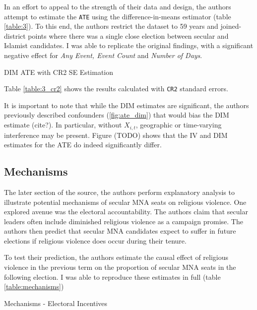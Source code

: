 \documentclass{scrartcl}
\begin{document}
In an effort to appeal to the strength of their data and design, the authors attempt to estimate the \texttt{ATE} using the difference-in-means estimator (table \ref{table:3}).
To this end, the authors restrict the dataset to 59 years and joined-district points where there was a single close election between secular and Islamist candidates. I was able to replicate the original findings, with a significant negative effect for \textit{Any Event, Event Count} and \textit{Number of Days}.


\begin{table}[ht!]
  \begin{center}
    \scalebox{0.75}{
      
    }
    \caption{DIM ATE with CR2 SE Estimation}
    \label{table:3_cr2}
  \end{center}
\end{table}

Table \ref{table:3_cr2} shows the results calculated with \texttt{CR2} standard errors. 

It is important to note that while the DIM estimates are significant, the authors previously described confounders (\ref{fig:ate_dim}) that would bias the DIM estimate (cite?).
In particular, without $X_{i,t}$, geographic or time-varying interference may be present.
Figure (TODO) shows that the IV and DIM estimates for the ATE do indeed significantly differ. 


\subsection{Mechanisms}

The later section of the source, the authors perform explanatory analysis to illustrate potential mechanisms of secular MNA seats on religious violence. One explored avenue was the electoral accountability. The authors claim that secular leaders often include diminished religious violence as a campaign promise. The authors then predict that secular MNA candidates expect to suffer in future elections if religious violence does occur during their tenure. 

To test their prediction, the authors estimate the causal effect of religious violence in the previous term on the proportion of secular MNA seats in the following election.
I was able to reproduce these estimates in full (table \ref{table:mechanisms})

\begin{table}[ht!]
  \begin{center}
    \scalebox{0.75}{
      
    }
    \caption{Mechanisms - Electoral Incentives}
    \label{table:mechanisms}
  \end{center}
\end{table}
\end{document}
